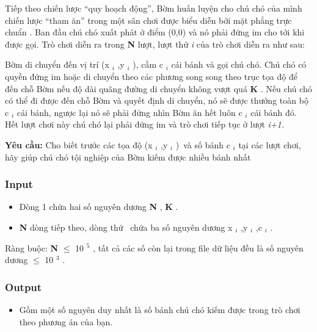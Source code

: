 



   Tiếp theo chiến lược “quy hoạch động”, Bờm huấn luyện cho chú chó của mình chiến lược “tham ăn” trong một sân chơi được biểu diễn bởi mặt phẳng trực chuẩn                                                   . Ban đầu chú chó xuất phát ở điểm (0,0) và nó phải đứng im cho tới khi được gọi. Trò chơi diễn ra trong   \textbf{    N   }   lượt, lượt thứ   \emph{    i   }   của trò chơi diễn ra như sau:  

   Bờm di chuyển đến vị trí (x   $_    i   $   ,y   $_    i   $   ), cầm c   $_    i   $   cái bánh và gọi chú chó. Chú chó có quyền đứng im hoặc di chuyển theo các phương song song theo trục tọa độ để đến chỗ Bờm nếu độ dài quãng đường di chuyển không vượt quá   \textbf{    K   }   . Nếu chú chó có thể đi được đến chỗ Bờm và quyết định di chuyển, nó sẽ được thưởng toàn bộ c   $_    i   $   cái bánh, ngược lại nó sẽ phải đứng nhìn Bờm ăn hết luôn c   $_    i   $   cái bánh đó. Hết lượt chơi này chú chó lại phải đứng im và trò chơi tiếp tục ở lượt   \emph{    i+1.   }

\textbf{    Yêu cầu:   }   Cho biết trước các tọa độ (x   $_    i   $   ,y   $_    i   $   ) và số bánh c   $_    i   $   tại các lượt chơi, hãy giúp chú chó tội nghiệp của Bờm kiếm được nhiều bánh nhất  

\subsubsection{   Input  }
\begin{itemize}
	\item     Dòng 1 chứa hai số nguyên dương    \textbf{     N    }    ,    \textbf{     K    }    .   
	\item \textbf{     N    }    dòng tiếp theo, dòng thứ     chứa ba số nguyên dương x    $_     i    $    ,y    $_     i    $    ,c    $_     i    $    .   
\end{itemize}

   Ràng buộc:   \textbf{    N   }    $\le$ 10   $^    5   $   , tất cả các số còn lại trong file dữ liệu đều là số nguyên dương  $\le$ 10   $^    3   $   .  

\subsubsection{   Output  }
\begin{itemize}
	\item     Gồm một số nguyên duy nhất là số bánh chú chó kiếm được trong trò chơi theo phương án của bạn.   
\end{itemize}

